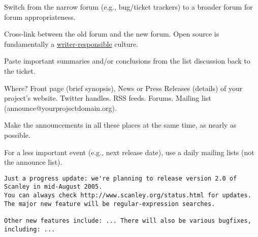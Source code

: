 \documentclass[landscape,30pt]{foils}
\begin{document}
Switch from the narrow forum (e.g., bug/ticket trackers) to a broader forum for forum appropriateness.

Cross-link between the old forum and the new forum.   Open source is fundamentally a \underline{writer-responsible} culture.

Paste important summaries and/or conclusions from the list discussion back to the ticket.


Where? Front page (brief synopsis), News or Press Releases (details) of your project's website.  Twitter handles.  RSS feeds.  Forums. Mailing list (announce@yourprojectdomain.org).

Make the announcements in all these places at the same time, as nearly as possible.

For a less important event (e.g., next release date), use a daily mailing lists (not the announce list).

{\tiny
\begin{verbatim}
Just a progress update: we're planning to release version 2.0 of Scanley in mid-August 2005. 
You can always check http://www.scanley.org/status.html for updates. 
The major new feature will be regular-expression searches.

Other new features include: ... There will also be various bugfixes, including: ...

\end{verbatim}
}




\end{document}
